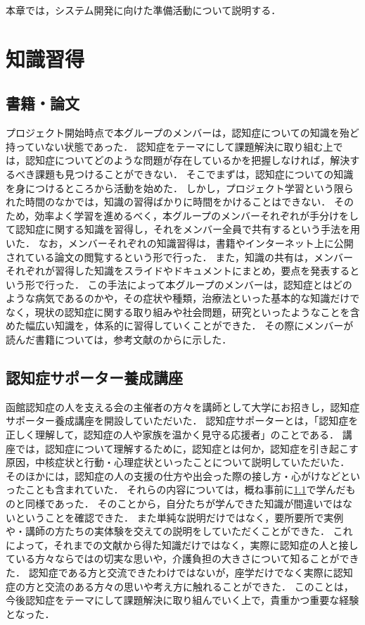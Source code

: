 \documentclass[../report]{subfiles}
\begin{document}
本章では，システム開発に向けた準備活動について説明する．


\section{知識習得}
\subsection{書籍・論文} \label{sec:document-article}
プロジェクト開始時点で本グループのメンバーは，認知症についての知識を殆ど持っていない状態であった．
認知症をテーマにして課題解決に取り組む上では，認知症についてどのような問題が存在しているかを把握しなければ，解決するべき課題も見つけることができない．
そこでまずは，認知症についての知識を身につけるところから活動を始めた．
しかし，プロジェクト学習という限られた時間のなかでは，知識の習得ばかりに時間をかけることはできない．
そのため，効率よく学習を進めるべく，本グループのメンバーそれぞれが手分けをして認知症に関する知識を習得し，それをメンバー全員で共有するという手法を用いた．
なお，メンバーそれぞれの知識習得は，書籍やインターネット上に公開されている論文の閲覧するという形で行った．
また，知識の共有は，メンバーそれぞれが習得した知識をスライドやドキュメントにまとめ，要点を発表するという形で行った．
この手法によって本グループのメンバーは，認知症とはどのような病気であるのかや，その症状や種類，治療法といった基本的な知識だけでなく，現状の認知症に関する取り組みや社会問題，研究といったようなことを含めた幅広い知識を，体系的に習得していくことができた．
その際にメンバーが読んだ書籍については，参考文献の\cite{approach}から\cite{world-planning}に示した．

\subsection{認知症サポーター養成講座}
函館認知症の人を支える会の主催者の方々を講師として大学にお招きし，認知症サポーター養成講座を開設していただいた．
認知症サポーターとは，「認知症を正しく理解して，認知症の人や家族を温かく見守る応援者」のことである．
講座では，認知症について理解するために，認知症とは何か，認知症を引き起こす原因，中核症状と行動・心理症状といったことについて説明していただいた．
そのほかには，認知症の人の支援の仕方や出会った際の接し方・心がけなどといったことも含まれていた．
それらの内容については，概ね事前に\ref{sec:document-article}で学んだものと同様であった．
そのことから，自分たちが学んできた知識が間違いではないということを確認できた．
また単純な説明だけではなく，要所要所で実例や・講師の方たちの実体験を交えての説明をしていただくことができた．
これによって，それまでの文献から得た知識だけではなく，実際に認知症の人と接している方々ならではの切実な思いや，介護負担の大きさについて知ることができた．
認知症である方と交流できたわけではないが，座学だけでなく実際に認知症の方と交流のある方々の思いや考え方に触れることができた．
このことは，今後認知症をテーマにして課題解決に取り組んでいく上で，貴重かつ重要な経験となった．
\end{document}
